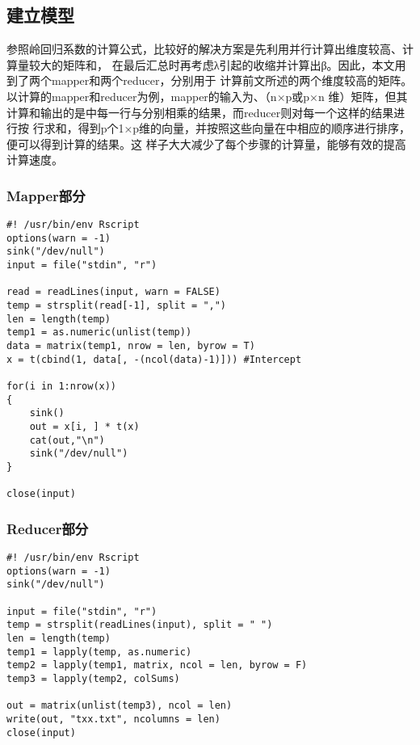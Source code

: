\subsection{建立模型}\label{ux5efaux7acbux6a21ux578b}

参照岭回归系数的计算公式，比较好的解决方案是先利用并行计算出维度较高、计算量较大的矩阵和，
在最后汇总时再考虑λ引起的收缩并计算出β。因此，本文用到了两个mapper和两个reducer，分别用于
计算前文所述的两个维度较高的矩阵。以计算的mapper和reducer为例，mapper的输入为、（n×p或p×n
维）矩阵，但其计算和输出的是中每一行与分别相乘的结果，而reducer则对每一个这样的结果进行按
行求和，得到p个1×p维的向量，并按照这些向量在中相应的顺序进行排序，便可以得到计算的结果。这
样子大大减少了每个步骤的计算量，能够有效的提高计算速度。

\subsubsection{Mapper部分}\label{mapperux90e8ux5206}

\begin{lstlisting}
#! /usr/bin/env Rscript
options(warn = -1)
sink("/dev/null")
input = file("stdin", "r")

read = readLines(input, warn = FALSE)
temp = strsplit(read[-1], split = ",")
len = length(temp)
temp1 = as.numeric(unlist(temp))
data = matrix(temp1, nrow = len, byrow = T)
x = t(cbind(1, data[, -(ncol(data)-1)])) #Intercept

for(i in 1:nrow(x))
{
    sink()
    out = x[i, ] * t(x)
    cat(out,"\n")
    sink("/dev/null")
}

close(input)
\end{lstlisting}

\subsubsection{Reducer部分}\label{reducerux90e8ux5206}

\begin{lstlisting}
#! /usr/bin/env Rscript
options(warn = -1)
sink("/dev/null")

input = file("stdin", "r")
temp = strsplit(readLines(input), split = " ")
len = length(temp)
temp1 = lapply(temp, as.numeric)
temp2 = lapply(temp1, matrix, ncol = len, byrow = F)
temp3 = lapply(temp2, colSums)

out = matrix(unlist(temp3), ncol = len)
write(out, "txx.txt", ncolumns = len)
close(input)
\end{lstlisting}

